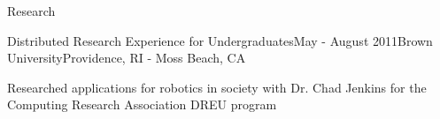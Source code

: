 \documentclass{resume} %
\begin{document}
\begin{rSection}{Research}

\begin{rSubsection}{Distributed Research Experience for Undergraduates}{May - August 2011}{Brown University}{Providence, RI - Moss Beach, CA}
\item Researched applications for robotics in society with Dr. Chad Jenkins for the Computing Research Association DREU program
\end{rSubsection}

\end{rSection}

\end{document}
